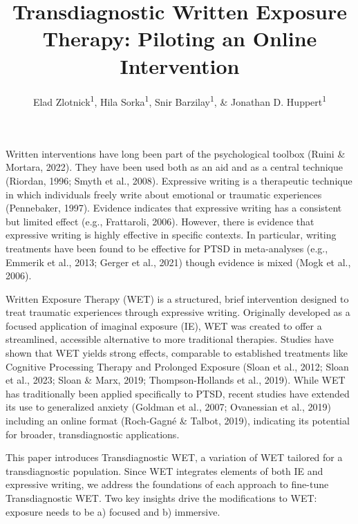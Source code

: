 \documentclass[
  man,floatsintext]{apa7}
\title{Transdiagnostic Written Exposure Therapy: Piloting an Online Intervention}
\author{Elad Zlotnick\textsuperscript{1}, Hila Sorka\textsuperscript{1}, Snir Barzilay\textsuperscript{1}, \& Jonathan D. Huppert\textsuperscript{1}}
\date{}
\affiliation{\vspace{0.5cm}\textsuperscript{1} The Hebrew University of Jerusalem}
\begin{document}
\maketitle

Written interventions have long been part of the psychological toolbox (Ruini \& Mortara, 2022).
They have been used both as an aid and as a central technique (Riordan, 1996; Smyth et al., 2008).
Expressive writing is a therapeutic technique in which individuals freely write about emotional or traumatic experiences (Pennebaker, 1997).
Evidence indicates that expressive writing has a consistent but limited effect (e.g., Frattaroli, 2006).
However, there is evidence that expressive writing is highly effective in specific contexts.
In particular, writing treatments have been found to be effective for PTSD in meta-analyses
(e.g., Emmerik et al., 2013; Gerger et al., 2021) though evidence is mixed (Mogk et al., 2006).

Written Exposure Therapy (WET) is a structured, brief intervention designed to treat traumatic experiences through expressive writing.
Originally developed as a focused application of imaginal exposure (IE), WET was created to offer a streamlined, accessible alternative to more traditional therapies.
Studies have shown that WET yields strong effects, comparable to established treatments like Cognitive Processing Therapy and Prolonged Exposure (Sloan et al., 2012; Sloan et al., 2023; Sloan \& Marx, 2019; Thompson-Hollands et al., 2019).
While WET has traditionally been applied specifically to PTSD, recent studies have extended its use to generalized anxiety (Goldman et al., 2007; Ovanessian et al., 2019) including an online format (Roch-Gagné \& Talbot, 2019), indicating its potential for broader, transdiagnostic applications.

This paper introduces Transdiagnostic WET, a variation of WET tailored for a transdiagnostic population.
Since WET integrates elements of both IE and expressive writing, we address the foundations of each approach to fine-tune Transdiagnostic WET.
Two key insights drive the modifications to WET: exposure needs to be a) focused and b) immersive.
\end{document}
